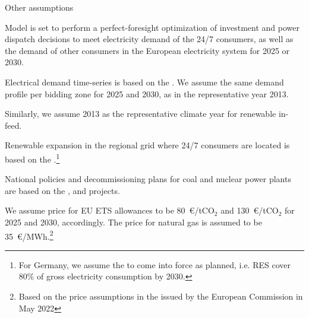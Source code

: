 \begin{frame}{Other assumptions}

\begin{itemize}
  {\small 
\item Model is set to perform a \alert{perfect-foresight optimization} of investment 
and power dispatch decisions to meet electricity demand of the 24/7 consumers, 
as well as the demand of other consumers in the European electricity system for 2025 or 2030.
\item Electrical demand time-series is based on the 
. 
We assume the same demand profile per bidding zone for 2025 and 2030, as in the representative year 2013.
\item Similarly, we assume 2013 as the representative climate year for renewable in-feed.
\item Renewable expansion in the regional grid where 24/7 consumers are located is based on the 
.\footnote{{\scriptsize For Germany, we assume the 
to come into force as planned, i.e. RES cover 80\% of gross electricity consumption by 2030.}}
\item  National policies and decommissioning plans for coal and nuclear 
power plants are based on the 
, 
and  projects.
\item We assume price for EU ETS allowances to be 80~\euro/tCO$_2$ 
and 130~\euro/tCO$_2$ for 2025 and 2030, accordingly. The price for 
natural gas is assumed to be 35~\euro/MWh.\footnote{{\scriptsize Based on the price assumptions in the 
issued by the European Commission in May 2022}}
}
\vspace{0.2cm}
\end{itemize}

\end{frame}


